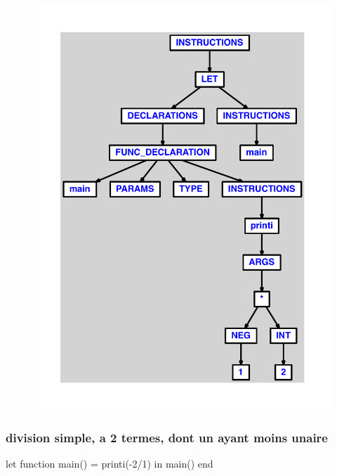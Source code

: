 \documentclass{article}
\begin{document}
\begin{figure}[H]\centering\includegraphics[max width=\textwidth]{ast/ast_65.pdf}\end{figure}\subsubsection{division simple, a 2 termes, dont un ayant moins unaire}
\begin{verbatimtab}
let
	function main() = printi(-2/1)
in main() end
\end{verbatimtab}
\end{document}
